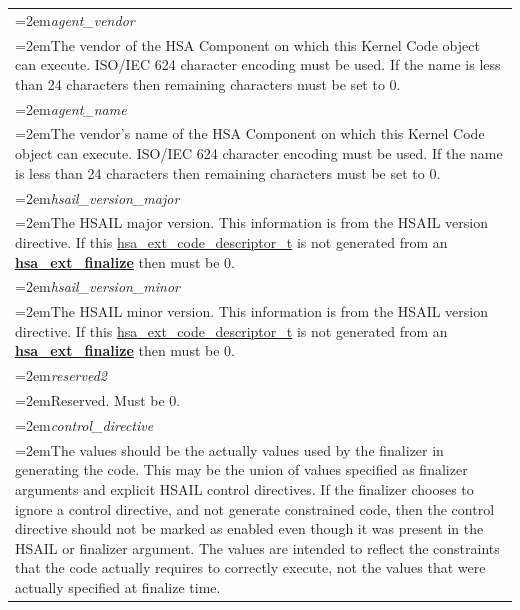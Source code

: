 \documentclass[final]{book}
\newcommand{\reffun}[1]{\textbf{#1}}
\newcommand{\reffld}[1]{\textit{#1}}
\begin{document}
\begin{longtable}{@{}>{\hangindent=2em}p{\textwidth}}
\reffld{agent_vendor}\\\hspace{2em}The vendor of the HSA Component on which this Kernel Code object can execute. ISO/IEC 624 character encoding must be used. If the name is less than 24 characters then remaining characters must be set to 0.\\[2mm]
\reffld{agent_name}\\\hspace{2em}The vendor's name of the HSA Component on which this Kernel Code object can execute. ISO/IEC 624 character encoding must be used. If the name is less than 24 characters then remaining characters must be set to 0.\\[2mm]
\reffld{hsail_version_major}\\\hspace{2em}The HSAIL major version. This information is from the HSAIL version directive. If this \hyperlink{group__FinalizerCoreApi_1ga0e01eabc57d7105ea37e1abbb50fa337}{hsa_ext_code_descriptor_t} is not generated from an \hyperlink{group__FinalizerCoreApi_1gad42cf738ed29770a7cec53fc13009a93}{\reffun{hsa_ext_finalize}} then must be 0.\\[2mm]
\reffld{hsail_version_minor}\\\hspace{2em}The HSAIL minor version. This information is from the HSAIL version directive. If this \hyperlink{group__FinalizerCoreApi_1ga0e01eabc57d7105ea37e1abbb50fa337}{hsa_ext_code_descriptor_t} is not generated from an \hyperlink{group__FinalizerCoreApi_1gad42cf738ed29770a7cec53fc13009a93}{\reffun{hsa_ext_finalize}} then must be 0.\\[2mm]
\reffld{reserved2}\\\hspace{2em}Reserved. Must be 0.\\[2mm]
\reffld{control_directive}\\\hspace{2em}The values should be the actually values used by the finalizer in generating the code. This may be the union of values specified as finalizer arguments and explicit HSAIL control directives. If the finalizer chooses to ignore a control directive, and not generate constrained code, then the control directive should not be marked as enabled even though it was present in the HSAIL or finalizer argument. The values are intended to reflect the constraints that the code actually requires to correctly execute, not the values that were actually specified at finalize time.
\end{longtable}
\end{document}
